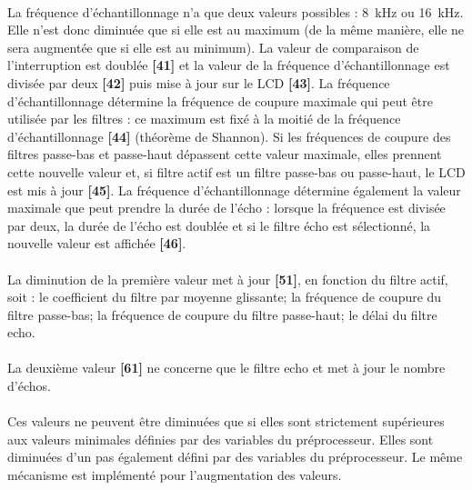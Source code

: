 \documentclass{article}
\begin{document}
    \paragraph{}
    La fréquence d'échantillonnage n'a que deux valeurs possibles : \SI{8}{\kilo\hertz} ou \SI{16}{\kilo\hertz}. Elle n'est donc diminuée que si elle est au maximum (de la même manière, elle ne sera augmentée que si elle est au minimum). La valeur de comparaison de l'interruption est doublée \textbf{[41]} et la valeur de la fréquence d'échantillonnage est divisée par deux \textbf{[42]} puis mise à jour sur le LCD \textbf{[43]}. La fréquence d'échantillonnage détermine la fréquence de coupure maximale qui peut être utilisée par les filtres : ce maximum est fixé à la moitié de la fréquence d'échantillonnage \textbf{[44]} (théorème de Shannon). Si les fréquences de coupure des filtres passe-bas et passe-haut dépassent cette valeur maximale, elles prennent cette nouvelle valeur et, si filtre actif est un filtre passe-bas ou passe-haut, le LCD est mis à jour \textbf{[45]}. La fréquence d'échantillonnage détermine également la valeur maximale que peut prendre la durée de l'écho : lorsque la fréquence est divisée par deux, la durée de l'écho est doublée et si le filtre écho est sélectionné, la nouvelle valeur est affichée \textbf{[46]}.

    \paragraph{}
    La diminution de la première valeur met à jour \textbf{[51]}, en fonction du filtre actif, soit : le coefficient du filtre par moyenne glissante; la fréquence de coupure du filtre passe-bas; la fréquence de coupure du filtre passe-haut; le délai du filtre echo.

    \paragraph{}
    La deuxième valeur \textbf{[61]} ne concerne que le filtre echo et met à jour le nombre d'échos.

    \paragraph{}
    Ces valeurs ne peuvent être diminuées que si elles sont strictement supérieures aux valeurs minimales définies par des variables du préprocesseur. Elles sont diminuées d'un pas également défini par des variables du préprocesseur. Le même mécanisme est implémenté pour l'augmentation des valeurs.
\end{document}
